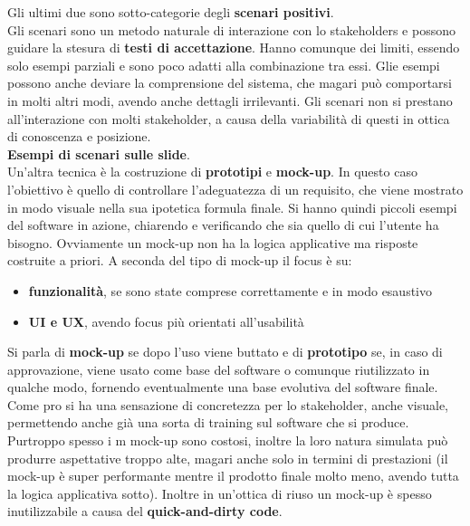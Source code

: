 \documentclass[a4paper,12pt, oneside]{book}
\begin{document}
Gli ultimi due sono sotto-categorie degli \textbf{scenari positivi}.\\
Gli scenari sono un metodo naturale di interazione con lo stakeholders e possono
guidare la stesura di \textbf{testi di accettazione}. Hanno comunque dei limiti,
essendo solo esempi parziali e sono poco adatti alla combinazione tra essi. Glie
esempi possono anche deviare la comprensione del sistema, che magari può
comportarsi in molti altri modi, avendo anche dettagli irrilevanti. Gli scenari
non si prestano all'interazione con molti stakeholder, a causa della variabilità
di questi in ottica di conoscenza e posizione.\\
\textbf{Esempi di scenari sulle slide}.\\
Un'altra tecnica è la costruzione di \textbf{prototipi} e \textbf{mock-up}. In
questo caso l'obiettivo è quello di controllare l'adeguatezza di un requisito,
che viene mostrato in modo visuale nella sua ipotetica formula finale. Si hanno
quindi piccoli esempi del software in azione, chiarendo e verificando che sia
quello di cui l'utente ha bisogno. Ovviamente un mock-up non ha la logica
applicative ma risposte costruite a priori. A seconda del tipo di mock-up il
focus è su:
\begin{itemize}
  \item \textbf{funzionalità}, se sono state comprese correttamente e in modo
  esaustivo
  \item \textbf{UI e UX}, avendo focus più orientati all'usabilità 
\end{itemize}
Si parla di \textbf{mock-up} se dopo l'uso viene buttato e di \textbf{prototipo}
se, in caso di approvazione, viene usato come base del software o comunque
riutilizzato in qualche modo, fornendo eventualmente una base evolutiva del
software finale.\\
Come pro si ha una sensazione di concretezza per lo stakeholder, anche visuale,
permettendo anche già una sorta di training sul software che si
produce. Purtroppo spesso i m mock-up sono costosi, inoltre la loro natura
simulata può produrre aspettative troppo alte, magari anche solo in termini di
prestazioni (il mock-up è super performante mentre il prodotto finale molto
meno, avendo tutta la logica applicativa sotto). Inoltre in un'ottica di riuso
un mock-up è spesso inutilizzabile a causa del \textbf{quick-and-dirty code}.
\end{document}
